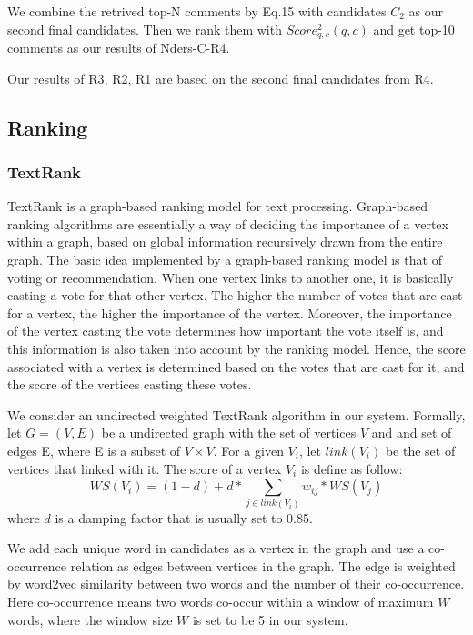 \documentclass{sig-alternate}
\begin{document}
We combine the retrived top-N comments by Eq.15 with candidates $C_2$ as our 
second final candidates. Then we rank them with $Score_{q,c}^2(q, c)$ and get 
top-10 comments as our results of Nders-C-R4.

Our results of R3, R2, R1 are based on the second final candidates from R4.

\subsection{Ranking}

\subsubsection{TextRank}

TextRank\cite{Mihalcea} is a graph-based ranking model for text processing. 
Graph-based ranking algorithms are essentially a
way of deciding the importance of a vertex within
a graph, based on global information recursively
drawn from the entire graph. The basic idea implemented
by a graph-based ranking model is that
of voting or recommendation. When one vertex
links to another one, it is basically casting a vote
for that other vertex. The higher the number of votes
that are cast for a vertex, the higher the importance
of the vertex. Moreover, the importance of the vertex
casting the vote determines how important the vote
itself is, and this information is also taken into account
by the ranking model. Hence, the score associated
with a vertex is determined based on the votes
that are cast for it, and the score of the vertices casting
these votes.

We consider an undirected weighted TextRank algorithm in our system. 
Formally, let $G = (V, E)$ be a undirected graph with the set of vertices $V$ and 
and set of edges E, where E is a subset of $V \times V$. For a given $V_i$, let 
$link(V_i)$ be the set of vertices that linked with it. The score of a vertex 
$V_i$ is define as follow:
\begin{equation}
  WS(V_i) = (1 - d) + d * \sum_{j \in link(V_i)}{w_{ij} * WS(V_j)}
\end{equation}
where $d$ is a damping factor\cite {Brin} that is usually set to 0.85.

We add each unique word in candidates as a vertex in the graph and use a 
co-occurrence relation as edges between vertices in the graph. The edge is 
weighted by word2vec similarity between two words and the number of their 
co-occurrence. Here co-occurrence means two words co-occur within a window of 
maximum $W$ words, where the window size $W$ is set to be 5 in our system.
\end{document}
